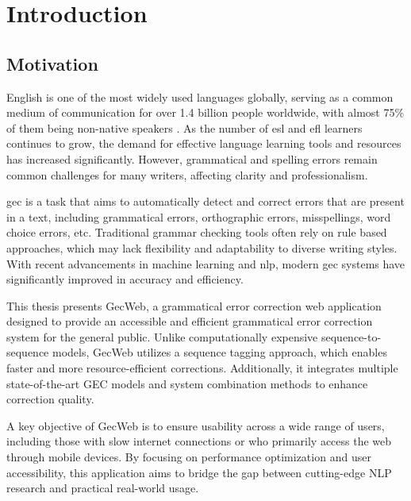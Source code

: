 \chapter{Introduction}

\section{Motivation}
\label{section:motivation}

English is one of the most widely used languages globally, serving as a common medium of communication for over 1.4 billion people worldwide, with almost 75\% of them being non-native speakers \citep{eberhard2015ethnologue}.
As the number of \acrfull{esl} and \acrfull{efl} learners continues to grow, the demand for effective language learning tools and resources has increased significantly.
However, grammatical and spelling errors remain common challenges for many writers, affecting clarity and professionalism.

\acrfull{gec} is a task that aims to automatically detect and correct errors that are present in a text, including grammatical errors, orthographic errors, misspellings, word choice errors, etc. \citep{ng-etal-2014-conll}
Traditional grammar checking tools often rely on rule based approaches, which may lack flexibility and adaptability to diverse writing styles.
With recent advancements in machine learning and \acrfull{nlp}, modern \acrshort{gec} systems have significantly improved in accuracy and efficiency.

This thesis presents GecWeb, a grammatical error correction web application designed to provide an accessible and efficient grammatical error correction system for the general public.
Unlike computationally expensive sequence-to-sequence models, GecWeb utilizes a sequence tagging approach, which enables faster and more resource-efficient corrections.
Additionally, it integrates multiple state-of-the-art GEC models and system combination methods to enhance correction quality.

A key objective of GecWeb is to ensure usability across a wide range of users, including those with slow internet connections or who primarily access the web through mobile devices.
By focusing on performance optimization and user accessibility, this application aims to bridge the gap between cutting-edge NLP research and practical real-world usage.


